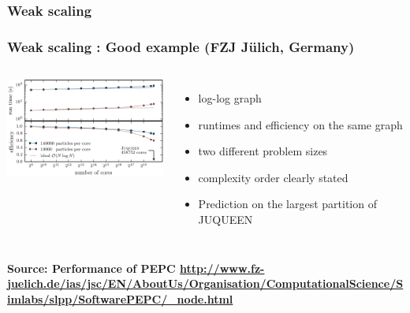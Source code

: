 \subsubsection{Weak scaling}

\begin{frame}[containsverbatim]
	\frametitle{Weak scaling : Good example (FZJ J\"ulich, Germany)}

\begin{columns}
\begin{center}
\includegraphics[width=6cm]{Day4/images/weak-good.png}
\end{center}

\begin{itemize}
	\item {log-log graph}
	\item {runtimes and efficiency on the same graph}
	\item {two different problem sizes}
	\item {complexity order clearly stated}
	\item {Prediction on the largest partition of JUQUEEN}
\end{itemize}
\end{columns}

\textbf{Source: Performance of PEPC \url{http://www.fz-juelich.de/ias/jsc/EN/AboutUs/Organisation/ComputationalScience/Simlabs/slpp/SoftwarePEPC/_node.html}}

\end{frame}



